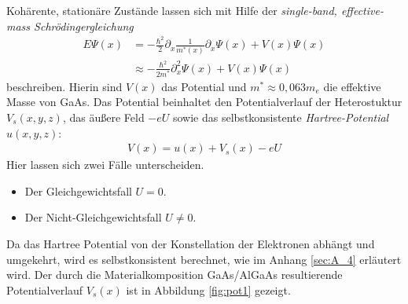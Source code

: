 Kohärente, stationäre Zustände lassen sich mit Hilfe der \emph{single-band, effective-mass Schrödingergleichung} \cite{frensley3}
\begin{equation}
  \begin{aligned}
    E\Psi(x) &= -\frac{\hbar^2}{2}\partial_x \frac{1}{m^*(x)}\partial_x\Psi(x) + V(x)\Psi(x)    \\
    &\approx -\frac{\hbar^2}{2m^*}\partial_x^2\Psi(x) + V(x)\Psi(x)
  \end{aligned}
  \label{eq:schroedinger}
\end{equation}
beschreiben. Hierin sind $V(x)$ das Potential und $m^*\approx 0,063m_e$ die effektive Masse von GaAs. Das Potential beinhaltet den Potentialverlauf der Heterostuktur $V_s(x,y,z)$, das äußere Feld $-eU$ sowie das selbstkonsistente \emph{Hartree-Potential} $u(x,y,z)$:
\begin{align}
  V({x}) = u({x}) + V_s({x}) - eU
\end{align}
Hier lassen sich zwei Fälle unterscheiden.
\begin{itemize}
  \item Der Gleichgewichtsfall $U=0$. %
  \item Der Nicht-Gleichgewichtsfall $U\neq 0$. %
\end{itemize}
Da das Hartree Potential von der Konstellation der Elektronen abhängt und umgekehrt, wird es selbstkonsistent berechnet, wie im Anhang \ref{sec:A_4} erläutert wird.
Der durch die Materialkomposition GaAs/AlGaAs resultierende Potentialverlauf $V_s(x)$ ist in Abbildung \ref{fig:pot1} gezeigt.
